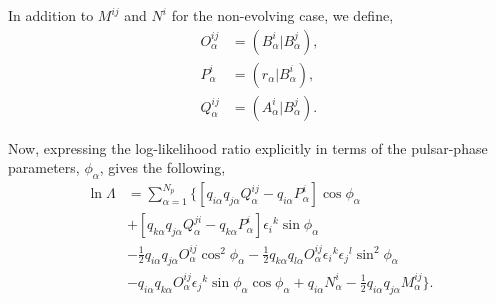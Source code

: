 \documentclass[prd,twocolumn,showpacs,nofootinbib]{revtex4}
\begin{document}
In addition to $M^{ij}$ and $N^i$ for the non-evolving case, we define,
\begin{align}
O^{ij}_{\alpha} &= (B^i_{\alpha}|B^j_{\alpha}),\nonumber\\
P^i_{\alpha} &= (r_{\alpha}|B^i_{\alpha}),\nonumber\\
Q^{ij}_{\alpha} &= (A^i_{\alpha}|B^j_{\alpha}).
\end{align}

Now, expressing the log-likelihood ratio explicitly in terms of the pulsar-phase parameters, $\phi_{\alpha}$, gives the following,
\begin{align}
\ln\Lambda& = \sum_{\alpha=1}^{N_p} \Big\{\left[q_{i\alpha}q_{j\alpha}Q_{\alpha}^{ij} - q_{i\alpha}P_{\alpha}^i\right]\cos\phi_{\alpha} \nonumber\\
&+ \left[q_{k\alpha}q_{j\alpha}Q_{\alpha}^{ji} - q_{k\alpha}P_{\alpha}^i\right]\epsilon_i{}^k\sin\phi_{\alpha} \nonumber\\
&- \frac{1}{2}q_{i\alpha}q_{j\alpha}O_{\alpha}^{ij}\cos^2\phi_{\alpha} - \frac{1}{2}q_{k\alpha}q_{l\alpha}O_{\alpha}^{ij}\epsilon_i{}^k\epsilon_j{}^l\sin^2\phi_{\alpha} \nonumber\\
&- q_{i\alpha}q_{k\alpha}O_{\alpha}^{ij}\epsilon_j{}^k\sin\phi_{\alpha}\cos\phi_{\alpha} + q_{i\alpha}N_{\alpha}^i - \frac{1}{2}q_{i\alpha}q_{j\alpha}M_{\alpha}^{ij}\Big\}.
\end{align}
\end{document}
